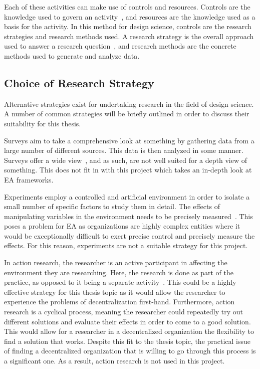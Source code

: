 Each of these activities can make use of controls and resources. Controls are the knowledge used to govern an activity~\cite[Ch. 4]{johannessonPerjons2012}, and  resources are the knowledge used as a basis for the activity. In this method for design science, controls are the research strategies and research methods used. A research strategy is the overall approach used to answer a research question~\cite[Ch. 3]{johannessonPerjons2012}, and research methods are the concrete methods used to generate and analyze data. 


\subsection{Choice of Research Strategy}

Alternative strategies exist for undertaking research in the field of design science. A number of common strategies will be briefly outlined in order to discuss their suitability for this thesis. 

Surveys aim to take a comprehensive look at something by gathering data from a large number of different sources. This data is then analyzed in some manner. Surveys offer a wide view~\cite{denscombe2010good,johannessonPerjons2012}, and as such, are not well suited for a depth view of something. This does not fit in with this project which takes an in-depth look at EA frameworks. 

Experiments employ a controlled and artificial environment in order to isolate a small number of specific factors to study them in detail. The effects of manipulating variables in the environment needs to be precisely measured~\cite{denscombe2010good}. This poses a problem for EA as organizations are highly complex entities where it would be exceptionally difficult to exert precise control and precisely measure the effects. For this reason, experiments are not a suitable strategy for this project. 

In action research, the researcher is an active participant in affecting the environment they are researching. Here, the research is done as part of the practice, as opposed to it being a separate activity~\cite{denscombe2010good}. This could be a highly effective strategy for this thesis topic as it would allow the researcher to experience the problems of decentralization first-hand. Furthermore, action research is a cyclical process, meaning the researcher could repeatedly try out different solutions and evaluate their effects in order to come to a good solution. This would allow for a researcher in a decentralized organization the flexibility to find a solution that works. Despite this fit to the thesis topic, the practical issue of finding a decentralized organization that is willing to go through this process is a significant one. As a result, action research is not used in this project. 

